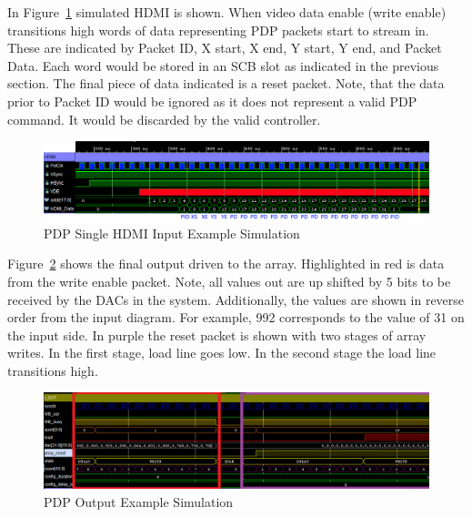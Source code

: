 In Figure~\ref{fig:input_example} simulated HDMI is shown. When video data enable (write enable) transitions high words of data representing PDP packets start to stream in. These are indicated by Packet ID, X start, X end, Y start, Y end, and Packet Data. Each word would be stored in an SCB slot as indicated in the previous section. The final piece of data indicated is a reset packet. Note, that the data prior to Packet ID would be ignored as it does not represent a valid PDP command. It would be discarded by the valid controller.

\begin{figure}
    \centering
    \includegraphics[width=1.0\textwidth]{fig/pdp_input_example.png}
    \caption{PDP Single HDMI Input Example Simulation}
    \label{fig:input_example}
\end{figure}

Figure~\ref{fig:output_example} shows the final output driven to the array. Highlighted in red is data from the write enable packet. Note, all values out are up shifted by 5 bits to be received by the DACs in the system. Additionally, the values are shown in reverse order from the input diagram. For example, 992 corresponds to the value of 31 on the input side. In purple the reset packet is shown with two stages of array writes. In the first stage, load line goes low. In the second stage the load line transitions high.

\begin{figure}
    \centering
    \includegraphics[width=1.0\textwidth]{fig/pdp_output_example.png}
    \caption{PDP Output Example Simulation}
    \label{fig:output_example}
\end{figure}
